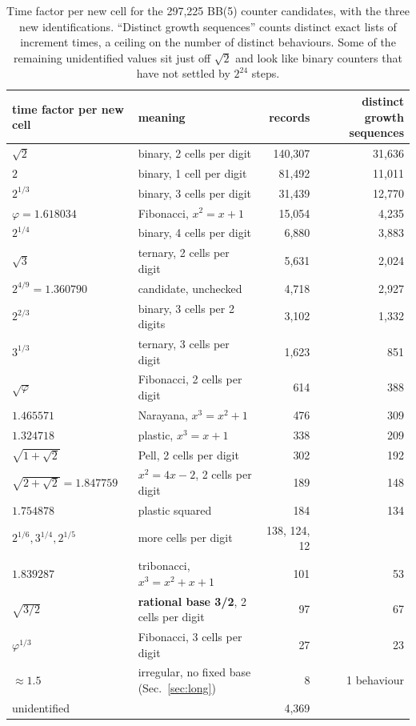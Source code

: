 \documentclass[11pt,a4paper]{article}
\newcommand{\BB}[1]{BB(#1)}
\begin{document}
\begin{table}[t]
\centering\small
\begin{tabular}{@{}llrr@{}}
\toprule
time factor per new cell & meaning & records & distinct growth sequences \\
\midrule
$\sqrt2$ & binary, 2 cells per digit & 140,307 & 31,636\\
$2$ & binary, 1 cell per digit & 81,492 & 11,011\\
$2^{1/3}$ & binary, 3 cells per digit & 31,439 & 12,770\\
$\varphi = 1.618034$ & Fibonacci, $x^2=x+1$ & 15,054 & 4,235\\
$2^{1/4}$ & binary, 4 cells per digit & 6,880 & 3,883\\
$\sqrt3$ & ternary, 2 cells per digit & 5,631 & 2,024\\
$2^{4/9} = 1.360790$ & candidate, unchecked & 4,718 & 2,927\\
$2^{2/3}$ & binary, 3 cells per 2 digits & 3,102 & 1,332\\
$3^{1/3}$ & ternary, 3 cells per digit & 1,623 & 851\\
$\sqrt\varphi$ & Fibonacci, 2 cells per digit & 614 & 388\\
$1.465571$ & Narayana, $x^3 = x^2+1$ & 476 & 309\\
$1.324718$ & plastic, $x^3 = x+1$ & 338 & 209\\
$\sqrt{1+\sqrt2}$ & Pell, 2 cells per digit & 302 & 192\\
$\sqrt{2+\sqrt2} = 1.847759$ & $x^2 = 4x - 2$, 2 cells per digit & 189 & 148\\
$1.754878$ & plastic squared & 184 & 134\\
$2^{1/6}, 3^{1/4}, 2^{1/5}$ & more cells per digit & 138, 124, 12 & \\
$1.839287$ & tribonacci, $x^3=x^2+x+1$ & 101 & 53\\
$\sqrt{3/2}$ & \textbf{rational base 3/2}, 2 cells per digit & 97 & 67\\
$\varphi^{1/3}$ & Fibonacci, 3 cells per digit & 27 & 23\\
$\approx1.5$ & irregular, no fixed base (Sec.~\ref{sec:long}) & 8 & 1 behaviour\\
unidentified & & 4,369 & \\
\bottomrule
\end{tabular}
\caption{Time factor per new cell for the 297,225 \BB{5} counter candidates, with the three new
identifications. ``Distinct growth sequences'' counts distinct exact lists of increment times, a
ceiling on the number of distinct behaviours. Some of the remaining unidentified values sit just
off $\sqrt2$ and look like binary counters that have not settled by $2^{24}$ steps.}
\label{tab:bases}
\end{table}
\end{document}
